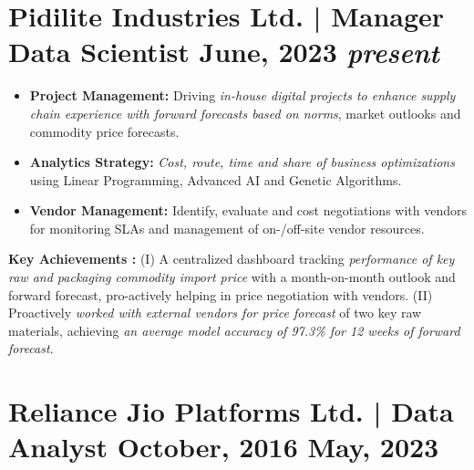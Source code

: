 
%

\section*{
    \SectionStylingFont \bfseries \textcolor{dBlue}{Pidilite Industries Ltd. | Manager Data Scientist} \hfill
    \small {\SectionStylingFontLight \bfseries \textcolor{lBlue}{
            \textbf{June, 2023} \textemdash \vspace{1pt} \textit{present}
    }}
}

\begin{itemize}
    \item \textbf{Project Management:} Driving \textit{in-house digital projects to enhance supply chain experience with forward forecasts based on norms}, market outlooks and commodity price forecasts.
    \item \textbf{Analytics Strategy:} \textit{Cost, route, time and share of business optimizations} using Linear Programming, Advanced AI and Genetic Algorithms.
    \item \textbf{Vendor Management:} Identify, evaluate and cost negotiations with vendors for monitoring SLAs and management of on-/off-site vendor resources.
\end{itemize}

\textbf{Key Achievements :} (I) A centralized dashboard tracking \textit{performance of key raw and packaging commodity import price} with a month-on-month outlook and forward forecast, pro-actively helping in price negotiation with vendors. (II) Proactively \textit{worked with external vendors for price forecast} of two key raw materials, achieving \textit{an average model accuracy of 97.3\% for 12 weeks of forward forecast}.

\section*{
	\SectionStylingFont \bfseries \textcolor{dBlue}{Reliance Jio Platforms Ltd. | Data Analyst} \hfill
	\small {\SectionStylingFontLight \bfseries \textcolor{lBlue}{
			\textbf{October, 2016} \textemdash \vspace{1pt} \textbf{May, 2023}
	}}
}

